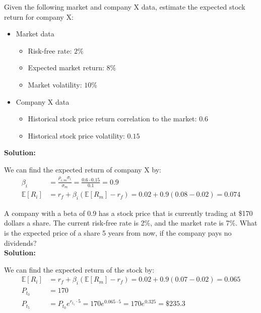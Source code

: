 \begin{example}
    Given the following market and company X data, estimate the expected stock return for company X:
    \begin{itemize}
        \item Market data
              \begin{itemize}
                  \item Risk-free rate: $2\%$
                  \item Expected market return: $8\%$
                  \item Market volatility: $10\%$
              \end{itemize}
        \item Company X data
              \begin{itemize}
                  \item Historical stock price return correlation to the market: $0.6$
                  \item Historical stock price volatility: $0.15$
              \end{itemize}
    \end{itemize}
    \textbf{Solution:}

    We can find the expected return of company X by:
    \begin{align*}
        \beta_i         & = \frac{\rho_{i,m} \sigma_i}{\sigma_{m}} = \frac{0.6 \cdot 0.15}{0.1} = 0.9 \\
        \mathbb{E}[R_i] & = r_f + \beta_i(\mathbb{E}[R_m] - r_f) = 0.02 + 0.9(0.08 - 0.02) = 0.074
    \end{align*}
\end{example}

\begin{definition}
    A company with a beta of 0.9 has a stock price that is currently trading at \$170 dollars a share. The current risk-free rate is 2\%, and the market rate is 7\%. What is the expected price of a share 5 years from now, if the company pays no dividends?\\

    \textbf{Solution:}

    We can find the expected return of the stock by:
    \begin{align*}
        \mathbb{E}[R_i] & = r_f + \beta_i(\mathbb{E}[R_m] - r_f) = 0.02 + 0.9(0.07 - 0.02) = 0.065        \\
        P_{t_0}         & = 170                                                                           \\
        P_{t_5}         & = P_{t_0} e^{r_{t_5} \cdot 5} = 170 e^{0.065 \cdot 5} = 170 e^{0.325} = \$235.3
    \end{align*}
\end{definition}


